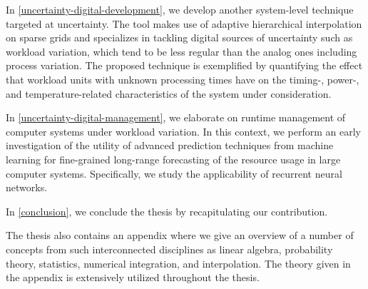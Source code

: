 In \cref{uncertainty-digital-development}, we develop another system-level
technique targeted at uncertainty. The tool makes use of adaptive hierarchical
interpolation on sparse grids and specializes in tackling digital sources of
uncertainty such as workload variation, which tend to be less regular than the
analog ones including process variation. The proposed technique is exemplified
by quantifying the effect that workload units with unknown processing times have
on the timing-, power-, and temperature-related characteristics of the system
under consideration.

In \cref{uncertainty-digital-management}, we elaborate on runtime management of
computer systems under workload variation. In this context, we perform an early
investigation of the utility of advanced prediction techniques from machine
learning for fine-grained long-range forecasting of the resource usage in large
computer systems. Specifically, we study the applicability of recurrent neural
networks.

In \cref{conclusion}, we conclude the thesis by recapitulating our contribution.

The thesis also contains an appendix where we give an overview of a number of
concepts from such interconnected disciplines as linear algebra, probability
theory, statistics, numerical integration, and interpolation. The theory given
in the appendix is extensively utilized throughout the thesis.
